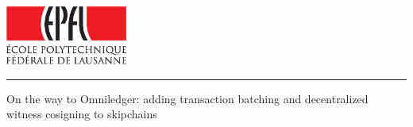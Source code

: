 
%        




\newcommand{\logoepfl}[0]{
  \begin{center}
    \includegraphics[width=4cm]{logo_epfl_coul.eps}
  \end{center}
  \vspace{0.3cm}
  \hrule
}
\newcommand{\project}[1]{
  \begin{center}
    \large{#1}
  \end{center}
  \vspace{1cm}
}
\newcommand{\department}[1]{
  \begin{center}
    \large{#1}
  \end{center}
}
\newcommand{\lab}[1]{
  \begin{center}
    \large{#1}
  \end{center}
}
\newcommand{\supervisor}[3]{
  \begin{center}
    \begin{normalsize}{
        \bf #1}\\#2\\#3
    \end{normalsize}
  \end{center}
}
\renewcommand{\author}[1]{
  \begin{center}
    \Large{#1}
  \end{center}
  \vspace{0.5cm}
}
\renewcommand{\title}[1]{
  \vspace{3cm}
  \begin{center}
    \huge{#1}
  \end{center}
  \vspace{1.7cm}
}
\renewcommand{\date}[2]{
  \begin{center}
    \normalsize{#1 #2}
  \end{center}
  \vspace{0.5cm}
}


\thispagestyle{empty}


  \logoepfl
  
  \title{On the way to Omniledger: adding transaction batching and decentralized witness cosigning to skipchains}
  
